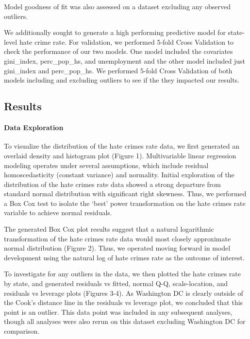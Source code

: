 \documentclass[
]{article}
\begin{document}
Model goodness of fit was also assessed on a dataset excluding any
observed outliers.

We additionally sought to generate a high performing predictive model
for state-level hate crime rate. For validation, we performed 5-fold
Cross Validation to check the performance of our two models. One model
included the covariates gini\_index, perc\_pop\_hs, and unemployment and
the other model included just gini\_index and perc\_pop\_hs. We
performed 5-fold Cross Validation of both models including and excluding
outliers to see if the they impacted our results.

\hypertarget{results}{%
\subsection{Results}\label{results}}

\hypertarget{data-exploration-1}{%
\paragraph{Data Exploration}\label{data-exploration-1}}

To visualize the distribution of the hate crimes rate data, we first
generated an overlaid density and histogram plot (Figure 1).
Multivariable linear regression modeling operates under several
assumptions, which include residual homoscedasticity (constant variance)
and normality. Initial exploration of the distribution of the hate
crimes rate data showed a strong departure from standard normal
distribution with significant right skewness. Thus, we performed a Box
Cox test to isolate the `best' power transformation on the hate crimes
rate variable to achieve normal residuals.

The generated Box Cox plot results suggest that a natural logarithmic
transformation of the hate crimes rate data would most closely
approximate normal distribution (Figure 2). Thus, we operated moving
forward in model development using the natural log of hate crimes rate
as the outcome of interest.

To investigate for any outliers in the data, we then plotted the hate
crimes rate by state, and generated residuals vs fitted, normal Q-Q,
scale-location, and residuals vs leverage plots (Figures 3-4). As
Washington DC is clearly outside of the Cook's distance line in the
residuals vs leverage plot, we concluded that this point is an outlier.
This data point was included in any subsequent analyses, though all
analyses were also rerun on this dataset excluding Washington DC for
comparison.
\end{document}
